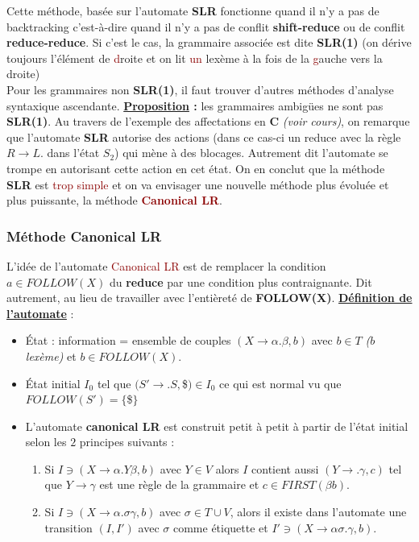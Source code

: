 \documentclass{article}
\newcommand{\dred}[1]{\textcolor{darkred}{\textbf{#1}}}
\newcommand{\red}[1]{\textcolor{darkred}{#1}}
\newcommand{\stitre}[1]{\noindent\textbf{\underline{#1}}}
\begin{document}
Cette méthode, basée sur l'automate \textbf{SLR} fonctionne quand il n'y a pas de backtracking c'est-à-dire quand il n'y a pas de conflit \textbf{shift-reduce} ou de conflit 
\textbf{reduce-reduce}. Si c'est le cas, la grammaire associée est dite \textbf{SLR(1)} (on dérive toujours l'élément de \red{d}roite et on lit \red{un} lexème à la fois de la 
\red{g}auche vers la droite) \\
\newpage
\noindent Pour les grammaires non \textbf{SLR(1)}, il faut trouver d'autres méthodes d'analyse syntaxique ascendante.
\textbf{\underline{Proposition} : } les grammaires ambigües ne sont pas \textbf{SLR(1)}.
Au travers de l'exemple des affectations en \textbf{C} \textit{(voir cours)}, on remarque que l'automate \textbf{SLR} autorise des actions (dans ce cas-ci un reduce avec la règle 
$R\rightarrow L .$ dans l'état $S_2$) qui mène à des blocages. Autrement dit l'automate se trompe en autorisant cette action en cet état. On en conclut que la méthode 
\textbf{SLR} est \red{trop simple} et on va envisager une nouvelle méthode plus évoluée et plus puissante, la méthode \dred{Canonical LR}.

\subsubsection{Méthode Canonical LR}

L'idée de l'automate \red{Canonical LR} est de remplacer la condition $a\in FOLLOW(X)$ du \textbf{reduce} par une condition plus contraignante. Dit autrement, au lieu de 
travailler avec l'entièreté de \textbf{FOLLOW(X)}. \stitre{Définition de l'automate} :\\
\begin{itemize}
\item État : information = ensemble de couples $(X\rightarrow \alpha . \beta, b)$ avec $b\in T$ \textit{($b$ lexème)} et $b\in FOLLOW(X)$.
\item État initial $I_0$ tel que $(S'\rightarrow.S, $\$$ ) \in I_0$ ce qui est normal vu que $FOLLOW(S') = \{$\$$\}$
\item L'automate \textbf{canonical LR} est construit petit à petit à partir de l'état initial selon les $2$ principes suivants :
\begin{enumerate}
\item Si $I \ni (X\rightarrow \alpha . Y\beta, b)$ avec $Y\in V$ alors $I$ contient aussi $(Y\rightarrow .\gamma,c)$ tel que $Y\rightarrow \gamma$ est une règle de la 
grammaire et $c\in FIRST(\beta b)$.
\item Si $I \ni (X\rightarrow \alpha . \sigma \gamma, b)$ avec $\sigma \in T\cup V$, alors il existe dans l'automate une transition $(I,I')$ avec $\sigma$ comme étiquette et 
$I' \ni (X\rightarrow \alpha \sigma . \gamma, b)$. \\
\end{enumerate}
\end{itemize}
\end{document}
